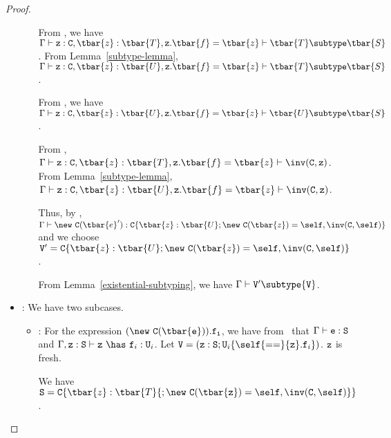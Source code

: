\begin{proof}
\begin{itemize}
\begin{itemize}

            From \TNew,
            we have
            $\Gamma \vdash {\tt z}: {\tt C}, \tbar{z}: \tbar{T}, {\tt z}.\tbar{f} = \tbar{z} \vdash \tbar{T} \subtype \tbar{S}$.
            From Lemma~\ref{subtype-lemma},
            $\Gamma \vdash {\tt z}: {\tt C}, \tbar{z}: \tbar{U}, {\tt z}.\tbar{f} = \tbar{z} \vdash \tbar{T} \subtype \tbar{S}$.

            From ,
            we have
            $\Gamma \vdash {\tt z}: {\tt C}, \tbar{z}: \tbar{U}, {\tt z}.\tbar{f} = \tbar{z} \vdash \tbar{U} \subtype \tbar{S}$.

            From \TNew,
            $\Gamma \vdash {\tt z}: {\tt C}, \tbar{z}: \tbar{T}, {\tt z}.\tbar{f} = \tbar{z} \vdash \inv({\tt C}, {\tt z})$.
            From Lemma~\ref{subtype-lemma},
            $\Gamma \vdash {\tt z}: {\tt C}, \tbar{z}: \tbar{U}, {\tt z}.\tbar{f} = \tbar{z} \vdash \inv({\tt C}, {\tt z})$.

            Thus, by \TNew,
            $\Gamma \vdash {\new\ {\tt C}(\tbar{e}')} : {\tt C}\{ \tbar{z}: \tbar{U}; \new\ {\tt C}(\tbar{z}) = \self, \inv({\tt C}, \self)\}$
            and we choose
            ${\tt V}' = {\tt C}\{ \tbar{z}: \tbar{U}; \new\ {\tt C}(\tbar{z}) = \self, \inv({\tt C}, \self)\}$.

            From Lemma~\ref{existential-subtyping}, we have
            $\Gamma \vdash {\tt V}' \subtype {\tt V}$.
   \end{itemize}
\item
\TField: We have two subcases.
   \begin{itemize}
   \item
   \RField:  For the expression ${\tt (\new\ C(\tbar{e})).f_i}$, 
             we have from \TField\ that
             $\Gamma \vdash {\tt e}: {\tt S}$ and
             $\Gamma, {\tt z}: {\tt S} \vdash {\tt z}\ \has\ {\tt f}_i: {\tt U}_i$.
             Let ${\tt V} = ({\tt z}: {\tt S}; {\tt U}_i\{\self{\tt ==}{\tt z}.{\tt f}_i\})$.
             ${\tt z}$ is fresh.


             We have 
             ${\tt S} = {\tt C}\{\tbar{z}: \tbar{T}{\tt ; \new\ {\tt C}(\tbar{z}) = \self, \inv({\tt C},\self)}\}$.


\end{itemize}
\end{itemize}
\end{proof}
